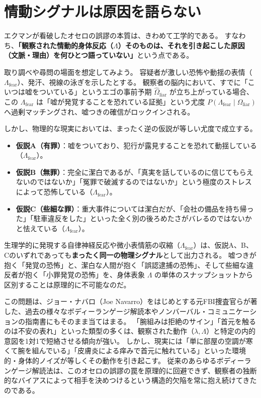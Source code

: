 \section{情動シグナルは原因を語らない}
エクマンが看破したオセロの誤謬の本質は、きわめて工学的である。
すなわち、\textbf{「観察された情動的身体反応（$\Lambda$）そのものは、それを引き起こした原因（文脈・理由）を何ひとつ語っていない」}という点である。

取り調べや尋問の場面を想定してみよう。
容疑者が激しい恐怖や動揺の表情（$\Lambda_{\mathrm{fear}}$）、発汗、視線の泳ぎを示したとする。
観察者の脳内において、すでに「こいつは嘘をついている」というエゴの事前予期 $\hat{\Omega}_{\mathrm{liar}}$ が立ち上がっている場合、この $\Lambda_{\mathrm{fear}}$ は「嘘が発覚することを恐れている証拠」という尤度 $P(\Lambda_{\mathrm{fear}} \mid \Omega_{\mathrm{liar}})$ へ過剰マッチングされ、嘘つきの確信がロックインされる。

しかし、物理的な現実においては、まったく逆の仮説が等しい尤度で成立する。
\begin{itemize}
\item \textbf{仮説A（有罪）}：嘘をついており、犯行が露見することを恐れて動揺している（$\Lambda_{\mathrm{fear}}$）。
\item \textbf{仮説B（無罪）}：完全に潔白であるが、「真実を話しているのに信じてもらえないのではないか」「冤罪で破滅するのではないか」という極度のストレスによって恐怖している（$\Lambda_{\mathrm{fear}}$）。
\item \textbf{仮説C（些細な罪）}：重大事件については潔白だが、「会社の備品を持ち帰った」「駐車違反をした」といった全く別の後ろめたさがバレるのではないかと怯えている（$\Lambda_{\mathrm{fear}}$）。
\end{itemize}

生理学的に発現する自律神経反応や微小表情筋の収縮（$\Lambda_{\mathrm{fear}}$）は、仮説A、B、Cのいずれであっても\textbf{まったく同一の物理シグナル}として出力される。
嘘つきが抱く「発覚の恐怖」と、潔白な人間が抱く「誤認逮捕の恐怖」、そして些細な違反者が抱く「小罪発覚の恐怖」を、身体表象 $\Lambda$ の単体のスナップショットから区別することは原理的に不可能なのだ。

この問題は、ジョー・ナバロ（Joe Navarro）をはじめとする元FBI捜査官らが著した、過去の様々なボディーランゲージ解読本やノンバーバル・コミュニケーションの指南書にもそのまま当てはまる。
「腕組みは拒絶のサイン」「首元を触るのは不安の表れ」といった類型の多くは、観察された動作（$\lambda, \Lambda$）と特定の内的意図を1対1で短絡させる傾向が強い。
しかし、現実には「単に部屋の空調が寒くて腕を組んでいる」「皮膚炎による痒みで首元に触れている」といった環境的・身体的ノイズが等しくその動作を引き起こす。
従来のあらゆるボディーランゲージ解読法は、このオセロの誤謬の罠を原理的に回避できず、観察者の独断的なバイアスによって相手を決めつけるという構造的欠陥を常に抱え続けてきたのである。

